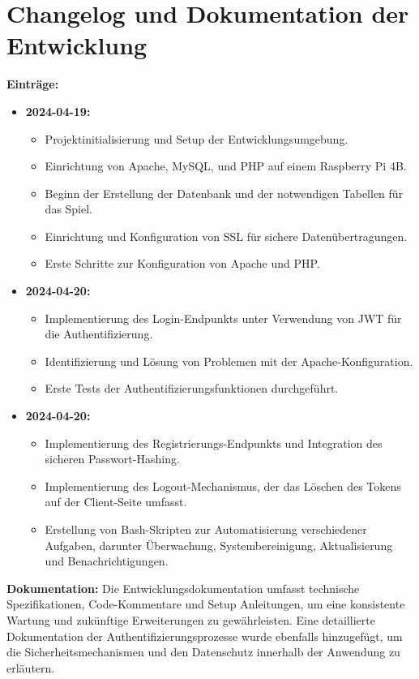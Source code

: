 \documentclass{article}
\begin{document}
\section{Changelog und Dokumentation der Entwicklung}
\textbf{Einträge:}
\begin{itemize}
\item \textbf{2024-04-19:} 
        \begin{itemize}
            \item Projektinitialisierung und Setup der Entwicklungsumgebung.
            \item Einrichtung von Apache, MySQL, und PHP auf einem Raspberry Pi 4B.
            \item Beginn der Erstellung der Datenbank und der notwendigen Tabellen für das Spiel.
            \item Einrichtung und Konfiguration von SSL für sichere Datenübertragungen.
            \item Erste Schritte zur Konfiguration von Apache und PHP.
        \end{itemize}
    \item \textbf{2024-04-20:}
        \begin{itemize}
            \item Implementierung des Login-Endpunkts unter Verwendung von JWT für die Authentifizierung.
            \item Identifizierung und Lösung von Problemen mit der Apache-Konfiguration.
            \item Erste Tests der Authentifizierungsfunktionen durchgeführt.
        \end{itemize}
    \item \textbf{2024-04-20:} 
        \begin{itemize}
            \item Implementierung des Registrierungs-Endpunkts und Integration des sicheren \newline Passwort-Hashing.
            \item Implementierung des Logout-Mechanismus, der das Löschen des Tokens auf der Client-Seite umfasst.
            \item Erstellung von Bash-Skripten zur Automatisierung verschiedener Aufgaben, darunter \newline Überwachung, Systembereinigung, Aktualisierung und Benachrichtigungen.
        \end{itemize}
\end{itemize}

\vspace{1em}
\textbf{Dokumentation:} \newline
Die Entwicklungsdokumentation umfasst technische Spezifikationen, Code-Kommentare und Setup Anleitungen, um eine konsistente Wartung und zukünftige Erweiterungen zu gewährleisten. Eine detaillierte Dokumentation der Authentifizierungsprozesse wurde ebenfalls hinzugefügt, um die Sicherheitsmechanismen und den Datenschutz innerhalb der Anwendung zu erläutern.



	
\end{document}
